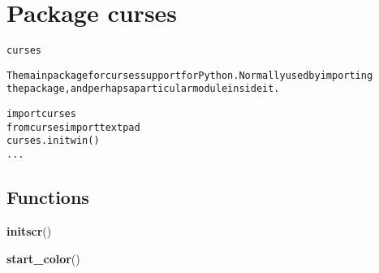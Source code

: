 %
%
%


\section{Package curses}

    \label{curses}
\begin{alltt}
curses

The main package for curses support for Python.  Normally used by importing
the package, and perhaps a particular module inside it.

   import curses
   from curses import textpad
   curses.initwin()
   ...
\end{alltt}



  \subsection{Functions}

    \label{curses:initscr}

    \vspace{0.5ex}

    \begin{boxedminipage}{\textwidth}

    \raggedright \textbf{initscr}()

    \end{boxedminipage}

    \label{curses:start_color}

    \vspace{0.5ex}

    \begin{boxedminipage}{\textwidth}

    \raggedright \textbf{start\_color}()

    \end{boxedminipage}


